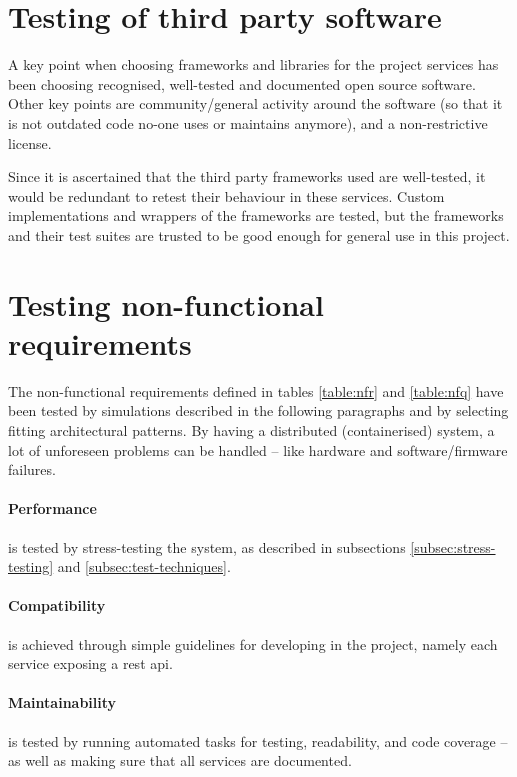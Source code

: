\section{Testing of third party software}

A key point when choosing frameworks and libraries for the project services has been choosing recognised, well-tested and documented open source software. 
Other key points are community/general activity around the software (so that it is not outdated code no-one uses or maintains anymore), and a non-restrictive license.

Since it is ascertained that the third party frameworks used are well-tested, it would be redundant to retest their behaviour in these services. Custom implementations and wrappers of the frameworks are tested, but the frameworks and their test suites are trusted to be good enough for general use in this project.

\section{Testing non-functional requirements}

The non-functional requirements defined in tables \ref{table:nfr} and \ref{table:nfq} have been tested by simulations described in the following paragraphs and by selecting fitting architectural patterns. By having a distributed (containerised) system, a lot of unforeseen problems can be handled -- like hardware and software/firmware failures. 

\paragraph{Performance} is tested by stress-testing the system, as described in subsections \ref{subsec:stress-testing} and \ref{subsec:test-techniques}.

\paragraph{Compatibility} is achieved through simple guidelines for developing in the project, namely each service exposing a \acrshort{rest} \acrshort{api}.

\paragraph{Maintainability} is tested by running automated tasks for testing, readability, and code coverage -- as well as making sure that all services are documented.

